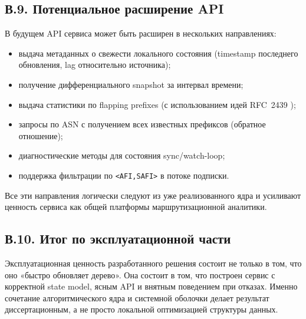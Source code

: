 \subsection*{В.9. Потенциальное расширение API}

В будущем API сервиса может быть расширен в нескольких направлениях:

\begin{itemize}
\item выдача метаданных о свежести локального состояния (timestamp
последнего обновления, lag относительно источника);
\item получение дифференциального snapshot за интервал времени;
\item выдача статистики по flapping prefixes (с использованием идей
RFC~2439 \cite{rfc2439});
\item запросы по ASN с получением всех известных префиксов (обратное
отношение);
\item диагностические методы для состояния sync/watch-loop;
\item поддержка фильтрации по \texttt{<AFI,SAFI>}
\cite{rfc4760} в потоке подписки.
\end{itemize}

Все эти направления логически следуют из уже реализованного ядра и
усиливают ценность сервиса как общей платформы маршрутизационной
аналитики.

\subsection*{В.10. Итог по эксплуатационной части}

Эксплуатационная ценность разработанного решения состоит не только в
том, что оно «быстро обновляет дерево». Она состоит в том, что
построен сервис с корректной state model, ясным API и внятным
поведением при отказах. Именно сочетание алгоритмического ядра и
системной оболочки делает результат диссертационным, а не просто
локальной оптимизацией структуры данных.

